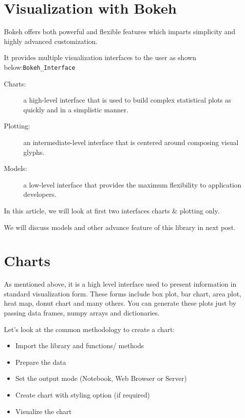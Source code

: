 
 

\section{Visualization with Bokeh}

Bokeh offers both powerful and flexible features which imparts simplicity and highly advanced customization. 



It provides multiple visualization interfaces to the user as shown below:\texttt{Bokeh\_Interface}


\begin{description}
\item[Charts:] a high-level interface that is used to build complex statistical plots as quickly and in a simplistic manner.
\item[Plotting:] an intermediate-level interface that is centered around composing visual glyphs.
\item[Models:] a low-level interface that provides the maximum flexibility to application developers.
\end{description}
In this article, we will look at first two interfaces charts & plotting only. 

We will discuss models and other advance feature of this library in next post.



\section{Charts}

As mentioned above, it is a high level interface used to present information in standard visualization form. 
These forms include box plot, bar chart, area plot, heat map, donut chart and many others. You can generate these plots just by passing data frames, numpy arrays and dictionaries.

Let’s look at the common methodology to create a chart:

\begin{itemize}
\item Import the library and functions/ methods
\item Prepare the data
\item Set the output mode (Notebook, Web Browser or Server)
\item Create chart with styling option (if required)
\item Visualize the chart
\end{itemize}


